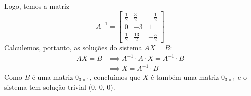Logo, temos a matriz
\begin{displaymath}
    A^{-1} = \left[\begin{array}{ccc}
         \frac{1}{2} & \frac{3}{2} & -\frac{1}{2} \\
         0 & -3 & 1 \\
         \frac{1}{2} & \frac{13}{2} & -\frac{5}{2}
    \end{array}\right]      
\end{displaymath}
Calculemos, portanto, as soluções do sistema $AX = B$:
\begin{align*}
    AX = B & \implies A^{-1} \cdot A \cdot X = A^{-1} \cdot B \\ & \implies
    X = A^{-1} \cdot B
\end{align*}
Como $B$ é uma matriz $0_{3\times1}$, concluímos que $X$ é também uma matriz $0_{3\times1}$ e o sistema tem solução trivial (0, 0, 0).